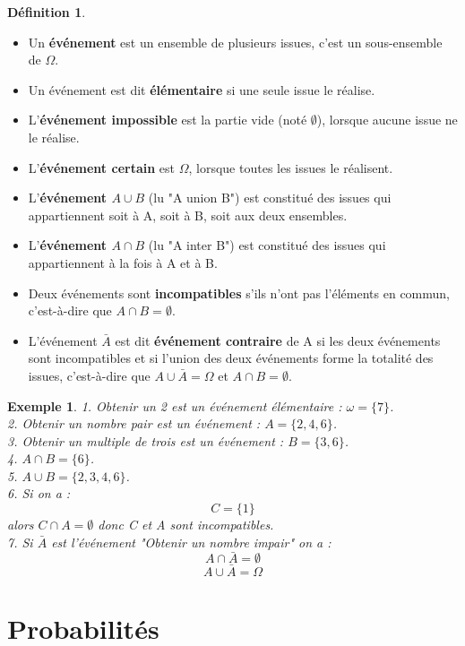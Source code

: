 \documentclass[a4paper,12pt]{article}
\newtheorem{Ex}{Exemple}[section]
\theoremstyle{theorem}
\theoremstyle{definition}
\theoremstyle{definition}
\theoremstyle{definition}
\newtheorem{Def}{Définition}[section]
\begin{document}
		\begin{Def}
			\begin{itemize}
				\item Un \textbf{événement} est un ensemble de plusieurs issues, c'est un sous-ensemble de $\Omega$.
				\item Un événement est dit \textbf{élémentaire} si une seule issue le réalise.
				\item L'\textbf{événement impossible} est la partie vide (noté $\emptyset$), lorsque aucune issue ne le réalise.
				\item L'\textbf{événement certain} est $\Omega$, lorsque toutes les issues le réalisent.
				\item L'\textbf{événement $A\cup B$} (lu "A union B") est constitué des issues qui appartiennent soit à A, soit à B, soit aux deux ensembles.
				\item L'\textbf{événement $A\cap B$} (lu "A inter B") est constitué des issues qui appartiennent à la fois à A et à B.
				\item Deux événements sont \textbf{incompatibles} s'ils n'ont pas l'éléments en commun, c'est-à-dire que $A\cap B = \emptyset$.
				\item L'événement $\bar{A}$ est dit \textbf{événement contraire} de A si les deux événements sont incompatibles et si l'union des deux événements forme la totalité des issues, c'est-à-dire que $A\cup \bar{A} = \Omega$ et $A\cap B = \emptyset$.
			\end{itemize}		
		\end{Def}

		\begin{Ex}
			1. Obtenir un 2 est un événement élémentaire : $\omega = \{7\}$. \\
			2. Obtenir un nombre pair est un événement : $A = \{2,4,6\}$. \\
			3. Obtenir un multiple de trois est un événement : $B = \{3,6\}$. \\
			4. $A\cap B = \{6\}$. \\
			5. $A\cup B = \{2,3,4,6\}$. \\
			6. Si on a : \[C = \{1\}\] alors $C\cap A = \emptyset$ donc C et A sont incompatibles. \\
			7. Si $\bar{A}$ est l'événement "Obtenir un nombre impair" on a : \[A\cap \bar{A} = \emptyset\]
			\[A\cup \bar{A} = \Omega\]
			
		\end{Ex}
	
\section{Probabilités}
\end{document}
